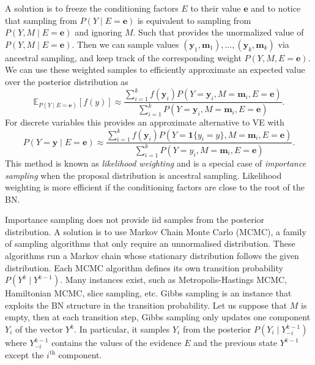  A solution is to freeze the conditioning factors $E$ to their value $\bm{e}$ and to notice that sampling from $P(Y\mid E=\bm{e})$ is equivalent to sampling from $P(Y, M\mid E=\bm{e})$ and ignoring $M$. Such that  provides the unormalized value of $P(Y, M\mid E=\bm{e})$. Then we can sample values $(\bm{y}_1, \bm{m}_1), \dots, (\bm{y}_k, \bm{m}_k)$ via ancestral sampling, and keep track of the corresponding weight $P(Y, M, E=\bm{e})$. We can use these weighted samples to efficiently approximate an expected value over the posterior distribution as
$$ \mathbb{E}_{P(Y\mid E=\bm{e})}\left[f(y)\right] \approx \frac{\sum_{i=1}^k f(\bm{y}_i) P(Y=\bm{y}_i, M=\bm{m}_i, E=\bm{e})}{\sum_{i=1}^k P(Y=\bm{y}_i, M=\bm{m}_i, E=\bm{e}) }.$$ For discrete variables this provides an approximate alternative to VE with $$P(Y=\bm{y}\mid E=\bm{e}) \approx \frac{\sum_{i=1}^k f(\bm{y}_i) P(Y=\bm{1}\{y_i = y\}, M=\bm{m}_i, E=\bm{e})}{\sum_{i=1}^k P(Y=y_i, M=\bm{m}_i, E=\bm{e})}. $$ This method is known as \textit{likelihood weighting} and is a special case of \textit{importance sampling} when the proposal distribution is ancestral sampling. Likelihood weighting is more efficient if the conditioning factors are close to the root of the BN.

Importance sampling does not provide iid samples from the posterior distribution. A solution is to use Markov Chain Monte Carlo (MCMC), a family of sampling algorithms that only require an unnormalised distribution. These algorithms run a Markov chain whose stationary distribution follows the given distribution. Each MCMC algorithm defines its own transition probability $P(Y^k\mid Y^{k-1})$. Many instances exist, such as Metropolis-Hastings MCMC, Hamiltonian MCMC, slice sampling, etc. Gibbs sampling is an instance that exploits the BN structure in the transition probability. Let us suppose that $M$ is empty, then at each transition step, Gibbs sampling only updates one component $Y_i$ of the vector $Y^k$. In particular, it samples $Y_i$ from the posterior $P(Y_i\mid Y_{-i}^{k-1})$ where $Y_{-i}^{k-1}$ contains the values of the evidence $E$ and the previous state $Y^{k-1}$ except the $i^{\text{th}}$ component.


